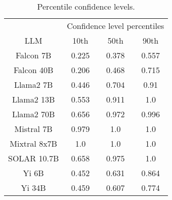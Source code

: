 \begin{table*}
\centering
\begin{tabular}{c|c|c|c}
& \multicolumn{3}{c}{Confidence level percentiles} \\ 
LLM & 10th & 50th & 90th\\ \hline
Falcon 7B & 0.225 & 0.378 & 0.557\\
Falcon 40B & 0.206 & 0.468 & 0.715\\
Llama2 7B & 0.446 & 0.704 & 0.91\\
Llama2 13B & 0.553 & 0.911 & 1.0\\
Llama2 70B & 0.656 & 0.972 & 0.996\\
Mistral 7B & 0.979 & 1.0 & 1.0\\
Mixtral 8x7B & 1.0 & 1.0 & 1.0\\
SOLAR 10.7B & 0.658 & 0.975 & 1.0\\
Yi 6B & 0.452 & 0.631 & 0.864\\
Yi 34B & 0.459 & 0.607 & 0.774\\
\hline
\end{tabular}
\caption{Percentile confidence levels.}
\label{tab:percentile_conf}
\end{table*}
